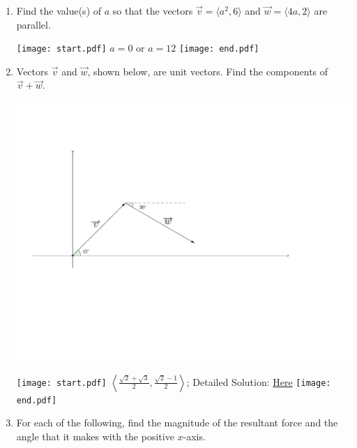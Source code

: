 \documentclass[12pt]{article}
\begin{document}
\begin{enumerate}
\item Find the value(s) of $a$ so that the vectors $\overrightarrow{v}=\langle a^2,6 \rangle$ and $\overrightarrow{w}=\langle 4a, 2 \rangle$ are parallel.

\texttt{[image: start.pdf]}
{{$a=0$ or $a=12$}}
\texttt{[image: end.pdf]}


\item Vectors $\overrightarrow{v}$ and $\overrightarrow{w}$, shown below, are unit vectors.  Find the components of $\overrightarrow{v}+\overrightarrow{w}$.

\begin{center}
\includegraphics[scale=0.5]{vector5.pdf}
\end{center}

\texttt{[image: start.pdf]}
{{$\left \langle \frac{\sqrt{2}+\sqrt{3}}{2},\frac{\sqrt{2}-1}{2}\right \rangle$; Detailed Solution: \textcolor{blue}{\href{http://www.math.drexel.edu/classes/Calculus/resources/Math200HW/Solutions/02_200_Vectors_09.pdf}{Here}}}}
\texttt{[image: end.pdf]}


\item For each of the following, find the magnitude of the resultant force and the angle that it makes with the positive $x$-axis.


\end{enumerate}
\end{document}
